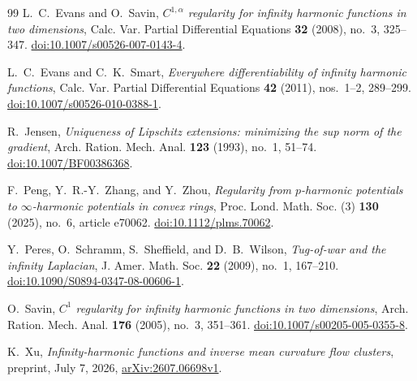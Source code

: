 \begin{thebibliography}{99}
L.~C.~Evans and O.~Savin,
\emph{$C^{1,\alpha}$ regularity for infinity harmonic functions in two dimensions},
Calc. Var. Partial Differential Equations \textbf{32} (2008), no.~3, 325--347.
\href{https://doi.org/10.1007/s00526-007-0143-4}{doi:10.1007/s00526-007-0143-4}.

L.~C.~Evans and C.~K.~Smart,
\emph{Everywhere differentiability of infinity harmonic functions},
Calc. Var. Partial Differential Equations \textbf{42} (2011), nos.~1--2, 289--299.
\href{https://doi.org/10.1007/s00526-010-0388-1}{doi:10.1007/s00526-010-0388-1}.

R.~Jensen,
\emph{Uniqueness of Lipschitz extensions: minimizing the sup norm of the gradient},
Arch. Ration. Mech. Anal. \textbf{123} (1993), no.~1, 51--74.
\href{https://doi.org/10.1007/BF00386368}{doi:10.1007/BF00386368}.

F.~Peng, Y.~R.-Y.~Zhang, and Y.~Zhou,
\emph{Regularity from $p$-harmonic potentials to $\infty$-harmonic potentials in convex rings},
Proc. Lond. Math. Soc. (3) \textbf{130} (2025), no.~6, article e70062.
\href{https://doi.org/10.1112/plms.70062}{doi:10.1112/plms.70062}.

Y.~Peres, O.~Schramm, S.~Sheffield, and D.~B.~Wilson,
\emph{Tug-of-war and the infinity Laplacian},
J. Amer. Math. Soc. \textbf{22} (2009), no.~1, 167--210.
\href{https://doi.org/10.1090/S0894-0347-08-00606-1}{doi:10.1090/S0894-0347-08-00606-1}.

O.~Savin,
\emph{$C^1$ regularity for infinity harmonic functions in two dimensions},
Arch. Ration. Mech. Anal. \textbf{176} (2005), no.~3, 351--361.
\href{https://doi.org/10.1007/s00205-005-0355-8}{doi:10.1007/s00205-005-0355-8}.

K.~Xu,
\emph{Infinity-harmonic functions and inverse mean curvature flow clusters},
preprint, July 7, 2026,
\href{https://arxiv.org/abs/2607.06698v1}{arXiv:2607.06698v1}.

\end{thebibliography}
